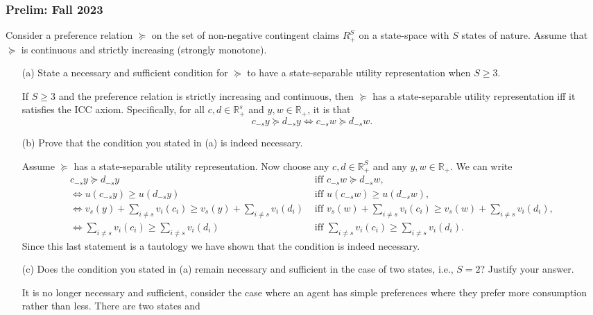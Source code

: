\documentclass[11pt,english]{article}
\begin{document}
\subsubsection{Prelim: Fall 2023}\label{Werner Prelim: Fall 2023}
Consider a preference relation $\succeq$ on the set of non-negative contingent
claims $R_+^S$ on a state-space with $S$ states of nature. Assume that
$\succeq$ is continuous and strictly increasing (strongly monotone).
 
\begin{enumerate}
    \item[(a)] State a necessary and sufficient condition for $\succeq$ to have
        a state-separable utility representation when $S \geq 3$.
    \begin{solution}
 If $S \geq 3$ and the preference relation is strictly increasing and continuous, then $\succeq$ has a state-separable utility representation iff it satisfies the ICC axiom. Specifically, for all $c,d\in \mathbb{R}^s_+$ and $y,w\in \mathbb{R}_+$, it is that $$c_{-s}y \succeq d_{-s}y  \Longleftrightarrow c_{-s}w \succeq d_{-s}w.$$
    \end{solution}
 
    \item[(b)] Prove that the condition you stated in (a) is indeed necessary.
    \begin{solution}
 Assume $\succeq$ has a state-separable utility representation. Now choose any $c,d\in \mathbb{R}_+^S$ and any $y, w\in \mathbb{R}_+$. We can write \begin{align*}
c_{-s}y \succeq d_{-s}y &\text{ iff } c_{-s}w \succeq d_{-s}w,\\
\Longleftrightarrow u(c_{-s}y) \geq u(d_{-s}y) &\text{ iff } u(c_{-s}w) \geq u(d_{-s}w),\\
\Longleftrightarrow  v_s(y) + \sum_{i\neq s} v_i(c_i) \geq v_s(y) + \sum_{i\neq s} v_i(d_i) &\text{ iff }  v_s(w) + \sum_{i\neq s} v_i(c_i) \geq v_s(w) + \sum_{i\neq s} v_i(d_i),\\
\Longleftrightarrow  \sum_{i\neq s} v_i(c_i) \geq \sum_{i\neq s} v_i(d_i) &\text{ iff } \sum_{i\neq s} v_i(c_i) \geq \sum_{i\neq s} v_i(d_i).
\end{align*} Since this last statement is a tautology we have shown that the condition is indeed necessary.
    \end{solution}
 
    \item[(c)] Does the condition you stated in (a) remain necessary and
        sufficient in the case of two states, i.e., $S = 2$? Justify your
        answer.
    \begin{solution}
 It is no longer necessary and sufficient, consider the case where an agent has simple preferences where they prefer more consumption rather than less. There are two states and 
    \end{solution}
 

\end{enumerate}
\end{document}

